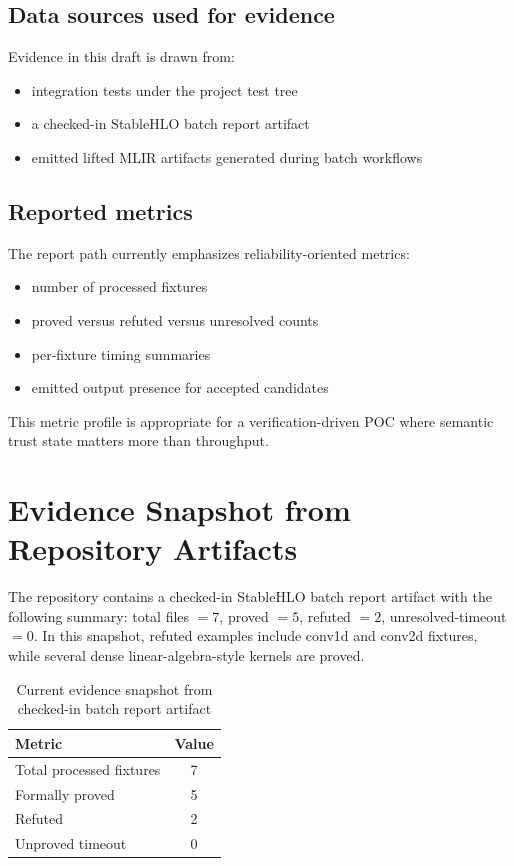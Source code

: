 \documentclass[conference]{IEEEtran}
\begin{document}
\subsection{Data sources used for evidence}
Evidence in this draft is drawn from:
\begin{itemize}
\item integration tests under the project test tree
\item a checked-in StableHLO batch report artifact
\item emitted lifted MLIR artifacts generated during batch workflows
\end{itemize}

\subsection{Reported metrics}
The report path currently emphasizes reliability-oriented metrics:
\begin{itemize}
\item number of processed fixtures
\item proved versus refuted versus unresolved counts
\item per-fixture timing summaries
\item emitted output presence for accepted candidates
\end{itemize}

This metric profile is appropriate for a verification-driven POC where semantic trust state matters more than throughput.

\section{Evidence Snapshot from Repository Artifacts}
The repository contains a checked-in StableHLO batch report artifact with the following summary: total files $=7$, proved $=5$, refuted $=2$, unresolved-timeout $=0$. In this snapshot, refuted examples include conv1d and conv2d fixtures, while several dense linear-algebra-style kernels are proved.

\begin{table}[t]
\caption{Current evidence snapshot from checked-in batch report artifact}
\label{tab:batch_snapshot}
\centering
\begin{tabular}{lc}
\toprule
Metric & Value \\
\midrule
Total processed fixtures & 7 \\
Formally proved & 5 \\
Refuted & 2 \\
Unproved timeout & 0 \\
\bottomrule
\end{tabular}
\end{table}
\end{document}
